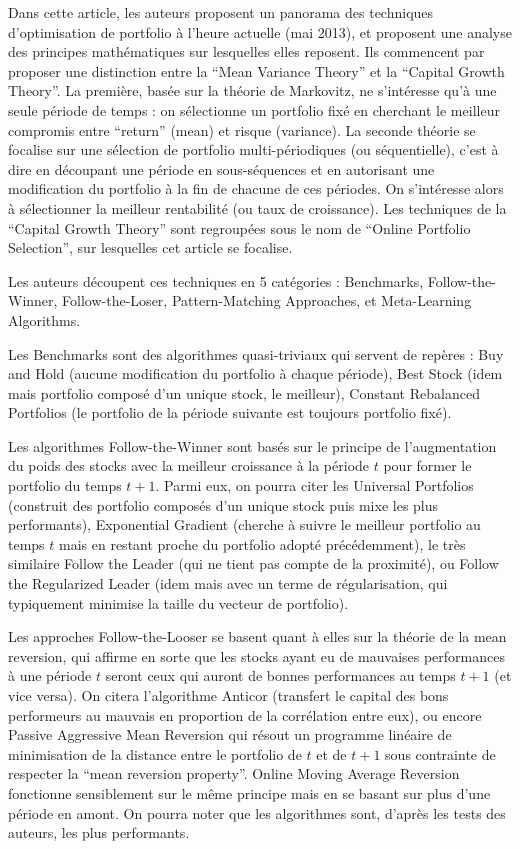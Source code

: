 \documentclass[a4paper]{article}
\begin{document}
Dans cette article, les auteurs proposent un panorama des techniques d'optimisation de portfolio à l'heure actuelle (mai 2013), et proposent une analyse des principes mathématiques sur lesquelles elles reposent. Ils commencent par proposer une distinction entre la ``Mean Variance Theory'' et la ``Capital Growth Theory''. La première, basée sur la théorie de Markovitz, ne s'intéresse qu'à une seule période de temps : on sélectionne un portfolio fixé en cherchant le meilleur compromis entre ``return'' (mean) et risque (variance). La seconde théorie se focalise sur une sélection de portfolio multi-périodiques (ou séquentielle), c'est à dire en découpant une période en sous-séquences et en autorisant une modification du portfolio à la fin de chacune de ces périodes. On s'intéresse alors à sélectionner la meilleur rentabilité (ou taux de croissance). Les techniques de la ``Capital Growth Theory'' sont regroupées sous le nom de ``Online Portfolio Selection'', sur lesquelles cet article se focalise.

Les auteurs découpent ces techniques en 5 catégories : Benchmarks, Follow-the-Winner, Follow-the-Loser, Pattern-Matching Approaches, et Meta-Learning Algorithms.

Les Benchmarks sont des algorithmes quasi-triviaux qui servent de repères : Buy and Hold (aucune modification du portfolio à chaque période), Best Stock (idem mais portfolio composé d'un unique stock, le meilleur), Constant Rebalanced Portfolios (le portfolio de la période suivante est toujours portfolio fixé).

Les algorithmes Follow-the-Winner sont basés sur le principe de l'augmentation du poids des stocks avec la meilleur croissance à la période $t$ pour former le portfolio du temps $t+1$. Parmi eux, on pourra citer les Universal Portfolios (construit des portfolio composés d'un unique stock puis mixe les plus performants), Exponential Gradient (cherche à suivre le meilleur portfolio au temps $t$ mais en restant proche du portfolio adopté précédemment), le très similaire Follow the Leader (qui ne tient pas compte de la proximité), ou Follow the Regularized Leader (idem mais avec un terme de régularisation, qui typiquement minimise la taille du vecteur de portfolio).

Les approches Follow-the-Looser se basent quant à elles sur la théorie de la mean reversion, qui affirme en sorte que les stocks ayant eu de mauvaises performances à une période $t$ seront ceux qui auront de bonnes performances au temps $t+1$ (et vice versa). On citera l'algorithme Anticor (transfert le capital des bons performeurs au mauvais en proportion de la corrélation entre eux), ou encore Passive Aggressive Mean Reversion qui résout un programme linéaire de minimisation de la distance entre le portfolio de $t$ et de $t+1$ sous contrainte de respecter la ``mean reversion property''. Online Moving Average Reversion fonctionne sensiblement sur le même principe mais en se basant sur plus d'une période en amont. On pourra noter que les algorithmes sont, d'après les tests des auteurs, les plus performants.
\end{document}
